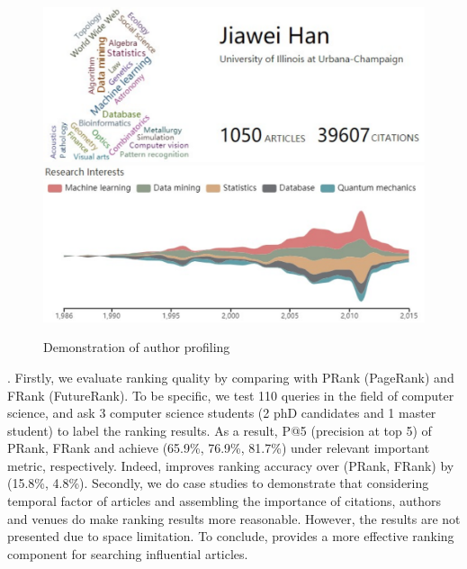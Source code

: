 

\begin{figure}
\centering
\includegraphics[width=0.98\columnwidth]{hjwAvatar.pdf}
\includegraphics[width=\columnwidth]{hjwInterest.pdf}
\vspace{-5ex}
\caption{Demonstration of author profiling }
\label{fig:hjwProfile}
\vspace{-5ex}
\end{figure}

.
Firstly, we evaluate ranking quality by comparing with PRank (PageRank) and FRank (FutureRank).
To be specific, we test 110 queries in the field of computer science, and ask 3 computer science students (2 phD candidates and 1 master student) to label the ranking results. As a result, P@5 (precision at top 5) of PRank, FRank and \oursystem achieve (65.9\%, 76.9\%, 81.7\%) under relevant important metric, respectively.
Indeed, \oursystem improves ranking accuracy over (PRank, FRank) by (15.8\%, 4.8\%).
Secondly, we do case studies to demonstrate that considering temporal factor of articles and assembling the importance of citations, authors and venues do make ranking results more reasonable. However, the results are not presented due to space limitation.
To conclude, \oursystem provides a more effective ranking component for searching influential articles. %

